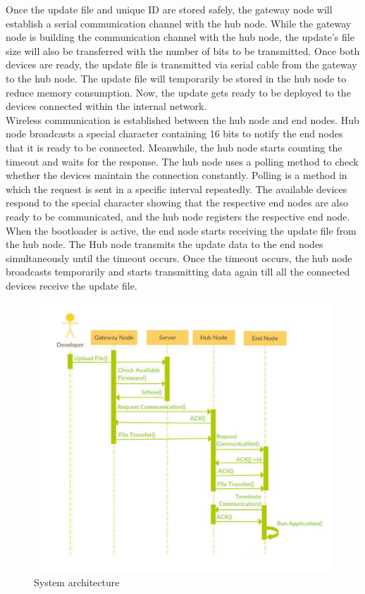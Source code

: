 \documentclass[12pt,a4paper]{article}
\begin{document}
{Once the update file and unique ID are stored safely, the gateway node will establish a serial communication channel with the hub node. While the gateway node is building the communication channel with the hub node, the update's file size will also be transferred with the number of bits to be transmitted. Once both devices are ready, the update file is transmitted via serial cable from the gateway to the hub node. The update file will temporarily be stored in the hub node to reduce memory consumption. Now, the update gets ready to be deployed to the devices connected within the internal network. \cite{r30} \\

Wireless communication is established between the hub node and end nodes. Hub node broadcasts a special character containing 16 bits to notify the end nodes that it is ready to be connected. Meanwhile, the hub node starts counting the timeout and waits for the response. The hub node uses a polling method to check whether the devices maintain the connection constantly. Polling is a method in which the request is sent in a specific interval repeatedly. The available devices respond to the special character showing that the respective end nodes are also ready to be communicated, and the hub node registers the respective end node. When the bootloader is active, the end node starts receiving the update file from the hub node. The Hub node transmits the update data to the end nodes simultaneously until the timeout occurs. Once the timeout occurs, the hub node broadcasts temporarily and starts transmitting data again till all the connected devices receive the update file. \cite{r30} \\



\begin{figure}[H]
\centering
\includegraphics[scale=1]{system_architecture.PNG}
\caption{System architecture \cite{r30}}
\label{system_architecture}
\end{figure}

}
\end{document}
